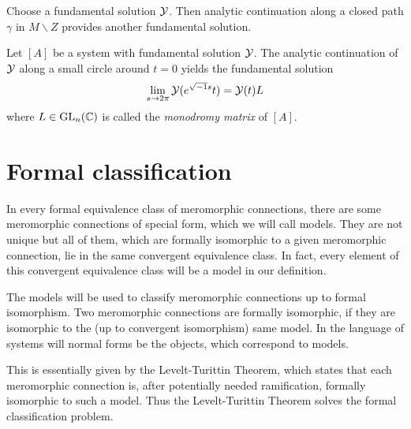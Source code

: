 Choose a fundamental solution $\mathcal{Y}$. Then analytic continuation along a closed
path $\gamma$ in $M\backslash Z$ provides another fundamental solution.
\begin{defn}
  Let $[A]$ be a system with fundamental solution $\mathcal{Y}$.
  The analytic continuation of $\mathcal{Y}$ along a small circle around $t=0$ yields
  the fundamental solution
  \[
    \lim_{s\to2\pi}\mathcal{Y}(e^{\sqrt{-1}s}t)=\mathcal{Y}(t)L
  \]
  where $L\in\operatorname{GL}_n(\mathbb{C})$ is called the \emph{\TODO[(formal)?]monodromy matrix}
  of $[A]$.
\end{defn}

\section{Formal classification}\label{sec:formalClassification}
In every formal equivalence class of meromorphic connections, there are some
meromorphic connections of special form, which we will call models. They are
not unique but all of them, which are formally isomorphic to a given
meromorphic connection, lie in the same convergent equivalence class.
In fact, every element of this convergent equivalence class will be a model in
our definition.

The models will be used to classify meromorphic connections up to formal
isomorphism. Two meromorphic connections are formally isomorphic, if they are
isomorphic to the (up to convergent isomorphism) same model. In the language of
systems will normal forms be the objects, which correspond to models.

This is essentially given by the Levelt-Turittin Theorem, which states that each
meromorphic connection is, after potentially needed ramification, formally
isomorphic to such a model. Thus the Levelt-Turittin Theorem solves the formal
classification problem.

